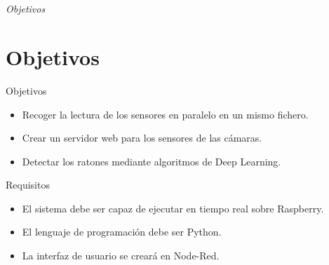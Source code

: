 \documentclass{beamer}
\begin{document}
\section*{}
\begin{frame}{}
  \centering \Huge
  \emph{Objetivos}
\end{frame}



\section{Objetivos}
\begin{frame}
\begin{block}{Objetivos}
\begin{itemize}
\item Recoger la lectura de los sensores en paralelo en un mismo fichero.
\item Crear un servidor web para los sensores de las cámaras.
\item Detectar los ratones mediante algoritmos de Deep Learning.
\end{itemize}
\end{block}

\begin{block}{Requisitos}
\begin{itemize}
\item El sistema debe ser capaz de ejecutar en tiempo real sobre Raspberry.
\item El lenguaje de programación debe ser Python.
\item La interfaz de usuario se creará en Node-Red.
\end{itemize}
\end{block}
\end{frame}
\end{document}
